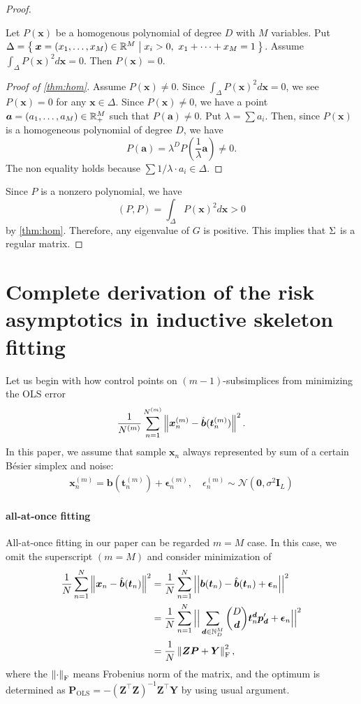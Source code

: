 \documentclass{article}
\begin{document}
\begin{proof}
\begin{claim}\label{thm:hom}
Let $P(\bm{x})$ be a homogenous polynomial of degree $D$ with $M$ variables.
Put $\Delta = \Set{\bm{x} = (x_1, \dots, x_M) \in \mathbb{R}^M | x_i > 0,\ x_1 + \dots + x_M = 1}$.
Assume $\int_{\Delta} P(\bm{x})^2 d \bm{x} = 0$.
Then $P(\bm{x}) = 0$.
\end{claim}

\begin{proof}[Proof of \cref{thm:hom}]
Assume $P(\bm{x}) \neq 0$.
Since $\int_{\Delta} P(\bm{x})^2 d \bm{x} = 0$, we see $P(\bm{x}) = 0$ for any $\bm{x} \in \Delta$.
Since $P(\bm{x}) \neq 0$, we have a point $\bm{a} = (a_1, \dots, a_M) \in \mathbb{R}^M_+$ such that $P(\bm{a}) \neq 0$.
Put $\lambda = \sum a_i$. Then, since $P(\bm{x})$ is a homogeneous polynomial of degree $D$, we have
\[
    P(\bm{a}) = \lambda^D P(\frac{1}{\lambda} \bm{a}) \neq 0.
\]
The non equality holds because $\sum 1 / \lambda \cdot a_i \in \Delta$.
\end{proof}

Since $P$ is a nonzero polynomial, we have
\[
    (P, P) = \int_{\Delta} P(\bm{x})^2 d \bm{x} > 0
\]
by \cref{thm:hom}.
Therefore, any eigenvalue of $G$ is positive.
This implies that $\Sigma$ is a regular matrix.
\end{proof}
\section{Complete derivation of the risk asymptotics in inductive skeleton fitting}\label{sec:risk-derivation}
Let us begin with how control points on $(m-1)$-subsimplices from minimizing the OLS error
\begin{align}
\frac{1}{N^{(m)}}
\sum_{n=1}^{N^{(m)}}
\left\| 
\bm x_n^{(m)}
-
\hat{\bm b} (\bm t_n^{(m)})
 \right\|^2
.
\end{align}
In this paper, we assume that sample $\bm x_n$ always represented by sum of a certain B\'esier simplex and noise:
\begin{align}
\bm x_n^{(m)}
=
\bm b (\bm t_n^{(m)})
+
\bm \epsilon_n^{(m)},
\quad
\epsilon_n^{(m)} \sim \mathcal{N}(\bm 0, \sigma^2 \bm I_L)
\end{align}
\paragraph{all-at-once fitting}
All-at-once fitting in our paper can be regarded $m=M$ case.
In this case, we omit the superscript $(m=M)$ and consider minimization of
\begin{align}
\frac{1}{N}
\sum_{n=1}^{N}
\left\| 
\bm x_n
-
\hat{\bm b} (\bm t_n)
 \right\|^2
&=
\frac{1}{N}
\sum_{n=1}^{N}
\Big| \Big|
{\bm b} (\bm t_n)
-
\hat{\bm b} (\bm t_n)
+
\bm \epsilon_n
\Big| \Big|^2
\notag \\
&=
\frac{1}{N}
\sum_{n=1}^{N}
\Big| \Big|
\sum_{\bm d \in \mathbb{N}_D^M}
\binom{D}{\bm d} \bm t^{\bm d}_n
\bm p_{\bm d}'
+
\bm \epsilon_n
\Big| \Big|^2
\notag \\
&=
\frac{1}{N}
\left\| 
\bm Z \bm P
+
\bm Y
 \right\|_\mathrm{F}^2,
\end{align}
where the $\left\| \cdot \right\|_\mathrm{F}$ means Frobenius norm of the matrix, and the optimum is determined as
$\bm P_\mathrm{OLS} = - (\bm Z^\top \bm Z)^{-1} \bm Z^\top \bm Y$ by using usual argument.
\end{document}
